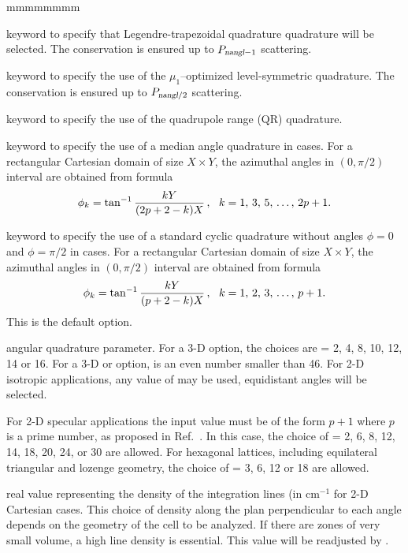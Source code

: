 \begin{ListeDeDescription}{mmmmmmmm}
\item[\moc{SMS}] keyword to specify that Legendre-trapezoidal quadrature quadrature will be selected.\cite{sms} The conservation is ensured up to $P_{\dusa{nangl}-1}$ scattering.

\item[\moc{LSN}] keyword to specify the use of the $\mu_1$--optimized level-symmetric quadrature. The conservation is ensured up to $P_{\dusa{nangl}/2}$ scattering.

\item[\moc{QRN}] keyword to specify the use of the quadrupole range (QR) quadrature.\cite{quadrupole}

\item[\moc{MEDI}] keyword to specify the use of a median angle quadrature in  cases. For
a rectangular Cartesian domain of size $X \times Y$, the azimuthal angles in $(0,\pi/2)$ interval are obtained from formula
$$
\phi_k=\tan^{-1}{\displaystyle kY\over\displaystyle (2p+2-k)X} \, , \ \ k=1,\, 3,\, 5, \, \dots, \, 2p+1 .
$$

\item[\moc{EQW2}] keyword to specify the use of a standard cyclic quadrature without angles $\phi=0$ and $\phi=\pi/2$ in  cases. For
a rectangular Cartesian domain of size $X \times Y$, the azimuthal angles in $(0,\pi/2)$ interval are obtained from formula
$$
\phi_k=\tan^{-1}{\displaystyle k Y\over\displaystyle (p+2-k)X} \, , \ \ k=1,\, 2,\, 3, \, \dots, \, p+1 .
$$
This is the default option.

\item[\dusa{nangl}] angular quadrature parameter. For a 3-D  option, the choices are  = 2, 4, 8, 10, 12, 14 
or 16. For a 3-D  or  option,  is an even number smaller than 46.\cite{ige260} For 2-D 
isotropic applications, any value of  may be used, equidistant angles will be selected.

For 2-D specular applications the input value must be of the form $p + 1$ where $p$ is a prime number, as proposed
in Ref.~. In this case, the choice of  = 2, 6, 8, 12, 14, 18, 20, 24, or 30 are allowed. For hexagonal lattices,
including equilateral triangular and lozenge geometry, the choice of  = 3, 6, 12 or 18 are allowed.

\item[\dusa{dens}] real value representing the density of the integration lines (in cm$^{-1}$ for 2-D Cartesian cases.
This choice of density along the plan perpendicular to each angle depends on the geometry of the cell to be analyzed. If there 
are zones of very small volume, a high line density is essential. This value will be readjusted by 
.


\end{ListeDeDescription}
